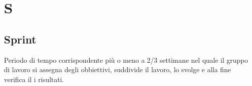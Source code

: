 \section{S}
\subsection{Sprint}
Periodo di tempo corrispondente più o meno a 2/3 settimane nel quale il gruppo di lavoro si assegna degli obbiettivi, suddivide il lavoro, lo svolge e alla fine verifica il i risultati.

\clearpage